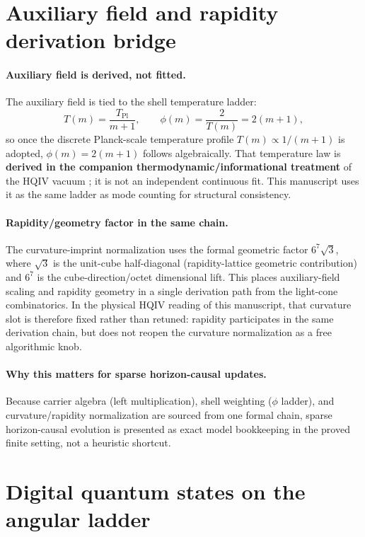 \documentclass[11pt,a4paper]{article}
\theoremstyle{remark}
\begin{document}
\section{Auxiliary field and rapidity derivation bridge}

\paragraph{Auxiliary field is derived, not fitted.}
The auxiliary field is tied to the shell temperature ladder:
\[
  T(m)=\frac{T_{\mathrm{Pl}}}{m+1},\qquad
  \phi(m)=\frac{2}{T(m)}=2(m+1),
\]
so once the discrete Planck-scale temperature profile $T(m)\propto 1/(m+1)$ is adopted, $\phi(m)=2(m+1)$ follows algebraically. That temperature law is \textbf{derived in the companion thermodynamic/informational treatment} of the HQIV vacuum \cite{ettinger2026hqiv}; it is not an independent continuous fit. This manuscript uses it as the same ladder as mode counting for structural consistency.

\paragraph{Rapidity/geometry factor in the same chain.}
The curvature-imprint normalization uses the formal geometric factor $6^7\sqrt{3}$, where $\sqrt{3}$ is the unit-cube half-diagonal (rapidity-lattice geometric contribution) and $6^7$ is the cube-direction/octet dimensional lift. This places auxiliary-field scaling and rapidity geometry in a single derivation path from the light-cone combinatorics. In the physical HQIV reading of this manuscript, that curvature slot is therefore fixed rather than retuned: rapidity participates in the same derivation chain, but does not reopen the curvature normalization as a free algorithmic knob.

\paragraph{Why this matters for sparse horizon-causal updates.}
Because carrier algebra (left multiplication), shell weighting ($\phi$ ladder), and curvature/rapidity normalization are sourced from one formal chain, sparse horizon-causal evolution is presented as exact model bookkeeping in the proved finite setting, not a heuristic shortcut.

\section{Digital quantum states on the angular ladder}
\end{document}
